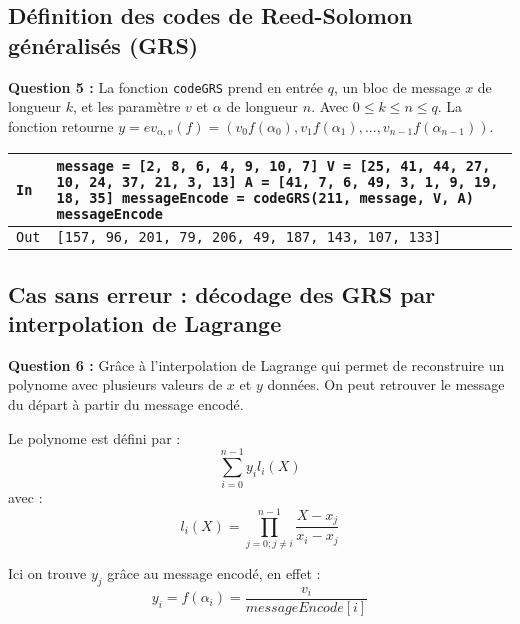 \documentclass[titlepage]{article}
\begin{document}
        \subsection{Définition des codes de Reed-Solomon généralisés (GRS)}

        \textbf{Question 5 :}
        La fonction \texttt{codeGRS} prend en entrée $q$, un bloc de message $x$ de longueur $k$, et les paramètre $v$ et $\alpha$ de longueur $n$.
        Avec $0 \leqslant k \leqslant n \leqslant q$. La fonction retourne $y = ev_{\alpha,v}(f) = (v_0f(\alpha_0), v_1f(\alpha_1), ..., v_{n-1}f(\alpha_{n-1}))$.

        

        \begin{tabularx}{12cm}{|p{0.60cm}|X|}
            \hline
            \rowcolor{gray}
            \texttt{In}
            & 
            \texttt{message = [2, 8, 6, 4, 9, 10, 7] \newline
            V = [25, 41, 44, 27, 10, 24, 37, 21, 3, 13] \newline
A =         [41, 7, 6, 49, 3, 1, 9, 19, 18, 35] \newline
            messageEncode = codeGRS(211, message, V, A) \newline
            messageEncode}
            \\
            \hline
            \texttt{Out}
            &
            \texttt{[157, 96, 201, 79, 206, 49, 187, 143, 107, 133]}
            \\
            \hline
        \end{tabularx}
        \bigbreak

        \subsection{Cas sans erreur : décodage des GRS par interpolation de Lagrange}
        \textbf{Question 6 :}
        Grâce à l'interpolation de Lagrange qui permet de reconstruire un polynome avec plusieurs valeurs de $x$ et $y$ données. 
        On peut retrouver le message du départ à partir du message encodé.

        Le polynome est défini par :
        \[\sum_{i=0}^{n-1}y_il_i(X)\]
        avec :
        \[l_i(X) = \prod_{j = 0; j \neq i}^{n - 1}\frac{X-x_j}{x_i-x_j} \]

        Ici on trouve $y_j$ grâce au message encodé, en effet : 
        \[y_i = f(\alpha_i) = \frac{v_i}{messageEncode[i]}\]
\end{document}
